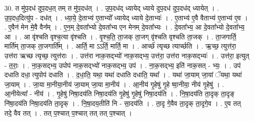 \documentclass[17pt]{extarticle}
\begin{document}
30. त मु॑प॒दध॑ दुप॒दध॒त् तम् त मु॑प॒दध॑त् । . उ॒प॒दध॑द् ध्यायेद् ध्याये दुप॒दध॑ दुप॒दध॑द् ध्यायेत् । . उ॒प॒दध॒दित्यु॑प - दध॑त् । . ध्या॒ये॒ दे॒ताभ्य॑ ए॒ताभ्यो᳚ ध्यायेद् ध्याये दे॒ताभ्यः॑ । . ए॒ताभ्य॑ ए॒वै वैताभ्य॑ ए॒ताभ्य॑ ए॒व । . ए॒वैन॑ मेन मे॒वै वैन᳚म् । . ए॒न॒म् दे॒वता᳚भ्यो दे॒वता᳚भ्य एन मेनम् दे॒वता᳚भ्यः । . दे॒वता᳚भ्य॒ आ दे॒वता᳚भ्यो दे॒वता᳚भ्य॒ आ । . आ वृ॑श्चति वृश्च॒त्या वृ॑श्चति । . वृ॒श्च॒ति॒ ता॒जक् ता॒जग् वृ॑श्चति वृश्चति ता॒जक् । . ता॒जगार्ति॒ मार्ति॑म् ता॒जक् ता॒जगार्ति᳚म् । . आर्ति॒ मा ऽऽर्ति॒ मार्ति॒ मा । . आर्च्छ॑ त्यृच्छ त्यार्च्छति । . ऋ॒च्छ॒ त्युत्त॑रा॒ उत्त॑रा ऋच्छ त्यृच्छ॒ त्युत्त॑राः । . उत्त॑रा नाक॒सद्भ्यो॑ नाक॒सद्भ्य॒ उत्त॑रा॒ उत्त॑रा नाक॒सद्भ्यः॑ । . उत्त॑रा॒ इत्युत् - त॒राः॒ । . ना॒क॒सद्भ्य॒ उपोप॑ नाक॒सद्भ्यो॑ नाक॒सद्भ्य॒ उप॑ । . ना॒क॒सद्भ्य॒ इति॑ नाक॒सत् - भ्यः॒ । . उप॑ दधाति दधा॒ त्युपोप॑ दधाति । . द॒धा॒ति॒ यथा॒ यथा॑ दधाति दधाति॒ यथा᳚ । . यथा॑ जा॒याम् जा॒यां ॅयथा॒ यथा॑ जा॒याम् । . जा॒या मा॒नीया॒नीय॑ जा॒याम् जा॒या मा॒नीय॑ । . आ॒नीय॑ गृ॒हेषु॑ गृ॒हे ष्वा॒नीया॒ नीय॑ गृ॒हेषु॑ । . आ॒नीयेत्या᳚ - नीय॑ । . गृ॒हेषु॑ निषा॒दय॑ति निषा॒दय॑ति गृ॒हेषु॑ गृ॒हेषु॑ निषा॒दय॑ति । . नि॒षा॒दय॑ति ता॒दृक् ता॒दृङ् नि॑षा॒दय॑ति निषा॒दय॑ति ता॒दृक् । . नि॒षा॒दय॒तीति॑ नि - सा॒दय॑ति । . ता॒दृ गे॒वैव ता॒दृक् ता॒दृगे॒व । . ए॒व तत् तदे॒ वैव तत् । . तत् प॒श्चात् प॒श्चात् तत् तत् प॒श्चात् । \newline
\end{document}
